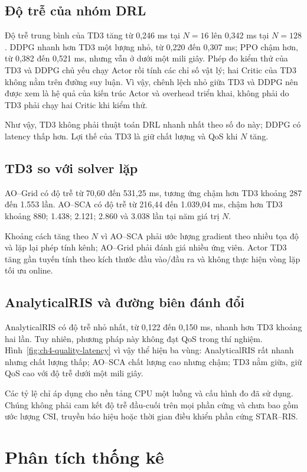 \subsection{Độ trễ của nhóm DRL}
Độ trễ trung bình của TD3 tăng từ 0,246 ms tại $N=16$ lên 0,342 ms tại $N=128$. DDPG nhanh hơn TD3 một lượng nhỏ, từ 0,220 đến 0,307 ms; PPO chậm hơn, từ 0,382 đến 0,521 ms, nhưng vẫn ở dưới một mili giây. Phép đo kiểm thử của TD3 và DDPG chủ yếu chạy Actor rồi tính các chỉ số vật lý; hai Critic của TD3 không nằm trên đường suy luận. Vì vậy, chênh lệch nhỏ giữa TD3 và DDPG nên được xem là hệ quả của kiến trúc Actor và overhead triển khai, không phải do TD3 phải chạy hai Critic khi kiểm thử.

Như vậy, TD3 không phải thuật toán DRL nhanh nhất theo số đo này; DDPG có latency thấp hơn. Lợi thế của TD3 là giữ chất lượng và QoS khi $N$ tăng.

\subsection{TD3 so với solver lặp}
AO--Grid có độ trễ từ 70,60 đến 531,25 ms, tương ứng chậm hơn TD3 khoảng 287 đến 1.553 lần. AO--SCA có độ trễ từ 216,44 đến 1.039,04 ms, chậm hơn TD3 khoảng 880; 1.438; 2.121; 2.860 và 3.038 lần tại năm giá trị $N$.

Khoảng cách tăng theo $N$ vì AO--SCA phải ước lượng gradient theo nhiều tọa độ và lặp lại phép tính kênh; AO--Grid phải đánh giá nhiều ứng viên. Actor TD3 tăng gần tuyến tính theo kích thước đầu vào/đầu ra và không thực hiện vòng lặp tối ưu online.

\subsection{AnalyticalRIS và đường biên đánh đổi}
AnalyticalRIS có độ trễ nhỏ nhất, từ 0,122 đến 0,150 ms, nhanh hơn TD3 khoảng hai lần. Tuy nhiên, phương pháp này không đạt QoS trong thí nghiệm. Hình~\ref{fig:ch4-quality-latency} vì vậy thể hiện ba vùng: AnalyticalRIS rất nhanh nhưng chất lượng thấp; AO--SCA chất lượng cao nhưng chậm; TD3 nằm giữa, giữ QoS cao với độ trễ dưới một mili giây.

Các tỷ lệ chỉ áp dụng cho nền tảng CPU một luồng và cấu hình đo đã sử dụng. Chúng không phải cam kết độ trễ đầu-cuối trên mọi phần cứng và chưa bao gồm ước lượng CSI, truyền báo hiệu hoặc thời gian điều khiển phần cứng STAR--RIS.

\section{Phân tích thống kê}


